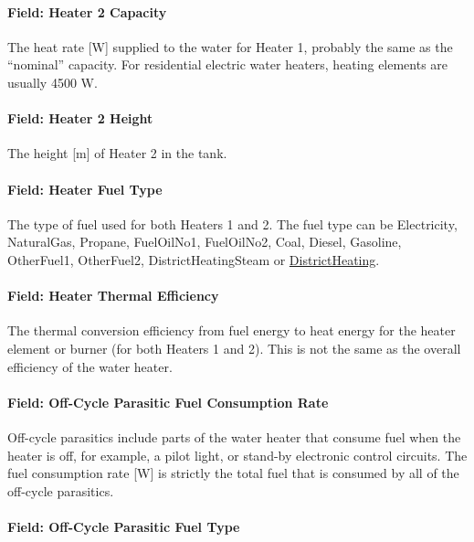 \paragraph{Field: Heater 2 Capacity}\label{field-heater-2-capacity}

The heat rate {[}W{]} supplied to the water for Heater 1, probably the same as the ``nominal'' capacity. For residential electric water heaters, heating elements are usually 4500 W.

\paragraph{Field: Heater 2 Height}\label{field-heater-2-height}

The height {[}m{]} of Heater 2 in the tank.

\paragraph{Field: Heater Fuel Type}\label{field-heater-fuel-type-1}

The type of fuel used for both Heaters 1 and 2. The fuel type can be Electricity, NaturalGas, Propane, FuelOilNo1, FuelOilNo2, Coal, Diesel, Gasoline, OtherFuel1, OtherFuel2, DistrictHeatingSteam or \hyperref[districtheating]{DistrictHeating}.

\paragraph{Field: Heater Thermal Efficiency}\label{field-heater-thermal-efficiency-1}

The thermal conversion efficiency from fuel energy to heat energy for the heater element or burner (for both Heaters 1 and 2). This is not the same as the overall efficiency of the water heater.

\paragraph{Field: Off-Cycle Parasitic Fuel Consumption Rate}\label{field-off-cycle-parasitic-fuel-consumption-rate-1}

Off-cycle parasitics include parts of the water heater that consume fuel when the heater is off, for example, a pilot light, or stand-by electronic control circuits. The fuel consumption rate {[}W{]} is strictly the total fuel that is consumed by all of the off-cycle parasitics.

\paragraph{Field: Off-Cycle Parasitic Fuel Type}\label{field-off-cycle-parasitic-fuel-type-1}

